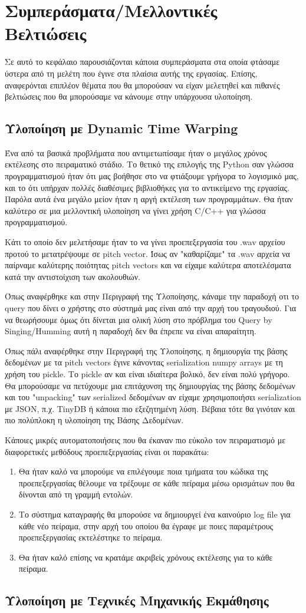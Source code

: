 \section{Συμπεράσματα/Μελλοντικές Βελτιώσεις}
Σε αυτό το κεφάλαιο παρουσιάζονται κάποια συμπεράσματα στα οποία φτάσαμε ύστερα από τη μελέτη που έγινε στα
πλαίσια αυτής της εργασίας. Επίσης, αναφερόνται επιπλέον θέματα που θα μπορούσαν να είχαν μελετηθεί 
και πιθανές βελτιώσεις που θα μπορούσαμε να κάνουμε στην υπάρχουσα υλοποίηση.

\subsection{Υλοποίηση με Dynamic Time Warping}
Ένα από τα βασικά προβλήματα που αντιμετωπίσαμε ήταν ο μεγάλος χρόνος εκτέλεσης στο πειραματικό στάδιο. Το θετικό της επιλογής της Python σαν γλώσσα προγραμματισμού ήταν ότι μας βοήθησε στο να φτιάξουμε γρήγορα το λογισμικό μας, και το ότι υπήρχαν πολλές διαθέσιμες βιβλιοθήκες για το αντικείμενο της εργασίας. Παρόλα αυτά ένα μεγάλο μείον ήταν η αργή εκτέλεση των προγραμμάτων. Θα ήταν καλύτερο σε μια μελλοντική υλοποίηση να γίνει χρήση C/C++ για γλώσσα προγραμματισμού.
  
Κάτι το οποίο δεν μελετήσαμε ήταν το να γίνει προεπεξεργασία του .wav αρχείου προτού το μετατρέψουμε σε pitch vector. Ίσως αν "καθαρίζαμε" τα .wav αρχεία να παίρναμε καλύτερης ποιότητας pitch vectors και να είχαμε καλύτερα αποτελέσματα κατά την αντιστοίχιση των ακολουθιών. 

Όπως αναφέρθηκε και στην Περιγραφή της Υλοποίησης, κάναμε την παραδοχή οτι το query που δίνει ο χρήστης στο σύστημά μας είναι από την αρχή του τραγουδιού. Για να θεωρήσουμε όμως ότι δίνεται μια ολική λύση στο πρόβλημα του Query by Singing/Humming αυτή η παραδοχή δεν θα έπρεπε να είναι απαραίτητη.

Όπως πάλι αναφέρθηκε στην Περιγραφή της Υλοποίησης, η δημιουργία της βάσης δεδομένων με τα pitch vectors έγινε κάνοντας serialization numpy arrays με τη χρήση του pickle. Το pickle αν και είναι ιδιαίτερα βολικό, δεν είναι πολύ γρήγορο. Θα μπορούσαμε να πετύχουμε μια επιτάχυνση της δημιουργίας της βάσης δεδομένων και του "unpacking" των serialized δεδομένων αν είχαμε χρησιμοποιήσει serialization με JSON, π.χ. TinyDB \cite{tinydb} ή κάποια πιο εξεζητημένη λύση. Βέβαια τότε θα γινόταν και πιο πολύπλοκη η υλοποίηση της Βάσης Δεδομένων.

Κάποιες μικρές αυτοματοποιήσεις που θα έκαναν πιο εύκολο τον πειραματισμό με διαφορετικές μεθόδους προεπεξεργασίας είναι οι παρακάτω:
\begin{enumerate}
	\item Θα ήταν καλό να μπορούμε να επιλέγουμε ποια τμήματα του κώδικα της προεπεξεργασίας θέλουμε να τρέξουμε σε κάθε πείραμα μέσω ορισμάτων που θα δίνονται από τη γραμμή εντολών.
 	\item Το σύστημα καταγραφής θα μπορούσε να δημιουργεί ένα καινούριο log file για κάθε νέο πείραμα, στην αρχή του οποίου θα έγραφε με ποιες παραμέτρους προεπεξεργασίας εκτελέστηκε το πείραμα.
  \item Θα ήταν καλό επίσης να κρατάμε ακριβείς χρόνους εκτέλεσης για το κάθε πείραμα. 
\end{enumerate} 

\subsection{Υλοποίηση με Τεχνικές Μηχανικής Εκμάθησης}